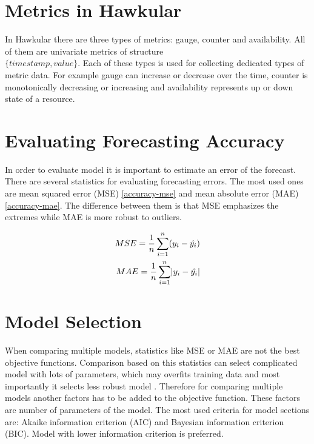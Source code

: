     \section{Metrics in Hawkular}
    In Hawkular there are three types of metrics: gauge, counter and availability. All of them are univariate metrics
    of structure \\$\{timestamp, value\}$. Each of these types is used for collecting dedicated types of metric data.
    For example gauge can increase or decrease over the time, counter is monotonically decreasing or increasing and
    availability represents up or down state of a resource.

    \section{Evaluating Forecasting Accuracy}
    In order to evaluate model it is important to estimate an error of the forecast. There are 
    several statistics for evaluating forecasting errors. The most used ones are mean squared error (MSE)
    \ref{accuracy-mse} and mean absolute error (MAE) \ref{accuracy-mae}. The difference between them is that MSE
    emphasizes the extremes while MAE is more robust to outliers.

    \begin{subequations} \label{accuracy}
        \begin{align} \label{accuracy-mse}
             MSE = \frac{1}{n} \sum_{i=1}^{n}(y_i - \hat{y_i}) \\ \label{accuracy-mae}
             MAE = \frac{1}{n} \sum_{i=1}^{n} \abs{y_i - \hat{y_i}}
         \end{align}
    \end{subequations}

    \section{Model Selection} \label{model-selection}
    When comparing multiple models, statistics like MSE or MAE are not the best objective functions. Comparison
    based on this statistics can select complicated model with lots of parameters, which may overfits training data
    and most importantly it selects less robust model \cite{cipra}. Therefore for comparing multiple models another
    factors has to be added to the objective function. These factors are number of parameters of the model. The
    most used criteria for model sections are: Akaike information criterion (AIC) and Bayesian information
    criterion (BIC). Model with lower information criterion is preferred.

